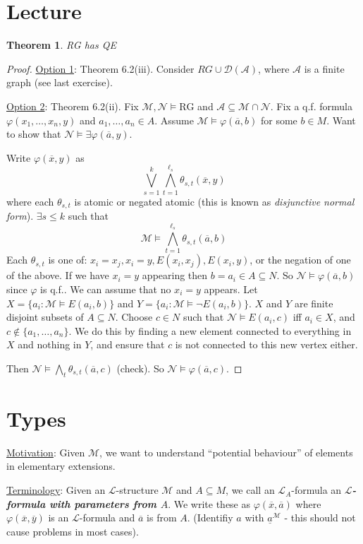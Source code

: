 \documentclass[]{article}
\theoremstyle{custhm}
\newtheorem{theorem}{Theorem}[section]
\theoremstyle{cusdef}
\theoremstyle{custhm}
\theoremstyle{custhm}
\theoremstyle{custhm}
\theoremstyle{ex}
\theoremstyle{custhm}
\theoremstyle{cusdef}
\theoremstyle{remark}
\theoremstyle{remark}
\theoremstyle{numremark}
\newcommand{\undf}[1]{\textit{\textbf{#1}}}
\renewcommand{\L}{\mathcal{L}}
\newcommand{\M}{\mathcal{M}}
\renewcommand{\phi}{\varphi}
\renewcommand{\bar}{\overline}
\newcommand{\N}{\mathcal{N}}
\newcommand{\A}{\mathcal{A}}
\newcommand{\D}{\mathcal{D}}
\renewcommand{\subset}{\subseteq}
\begin{document}
\section{Lecture}

\begin{theorem}
RG has QE
\end{theorem}
\begin{proof}
\underline{Option 1}: Theorem 6.2(iii). Consider $RG \cup \D(\A)$, where $\A$ is a finite graph (see last exercise).

\underline{Option 2}: Theorem 6.2(ii). Fix $\M,\N\models \textrm{RG}$ and $\A\subset \M\cap \N$. Fix a q.f. formula $\phi(x_1,\dots,x_n,y)$ and $a_1,\dots,a_n\in A$. Assume $\M\models \phi(\bar{a},b)$ for some $b\in M$. Want to show that $\N\models \exists \phi(\bar{a},y)$.

Write $\phi(\bar{x},y)$ as $$\bigvee_{s=1}^{k}\bigwedge_{t=1}^{\ell_s}\theta_{s,t}(\bar{x},y)$$ where each $\theta_{s,t}$ is atomic or negated atomic (this is known as \textit{disjunctive normal form}). $\exists s\le k$ such that $$\M\models\bigwedge_{t=1}^{\ell_s}\theta_{s,t}(\bar{a},b)$$
Each $\theta_{s,t}$ is one of: $x_i = x_j, x_i = y,E(x_i,x_j),E(x_i,y)$, or the negation of one of the above. If we have $x_i = y$ appearing then $b = a_i\in A\subset N$. So $\N \models \phi(\bar{a},b)$ since $\phi$ is q.f.. We can assume that no $x_i = y$ appears. Let $X = \{a_i:\M\models E(a_i,b)\}$ and $Y = \{a_i : \M\models \neg E(a_i,b)\}$. $X$ and $Y$ are finite disjoint subsets of $A\subset N$. Choose $c\in N$ such that $\N\models E(a_i,c)$ iff $a_i \in X$, and $c\not\in\{a_1,\dots,a_n\}$. We do this by finding a new element connected to everything in $X$ and nothing in $Y$, and ensure that $c$ is not connected to this new vertex either.

Then $\N\models \bigwedge_{t}\theta_{s,t}(\bar{a},c)$ (check). So $\N\models \phi(\bar{a},c)$.
\end{proof}

\section*{Types}

\underline{Motivation}: Given $\M$, we want to understand ``potential behaviour'' of elements in elementary extensions.

\underline{Terminology}: Given an $\L$-structure $\M$ and $A\subset M$, we call an $\L_A$-formula an \undf{$\L$-formula with parameters from $A$}. We write these as $\phi(\bar{x},\bar{a})$ where $\phi(\bar{x},\bar{y})$ is an $\L$-formula and $\bar{a}$ is from $A$. (Identifiy $a$ with $\underline{a}^\M$ - this should not cause problems in most cases).
\end{document}
